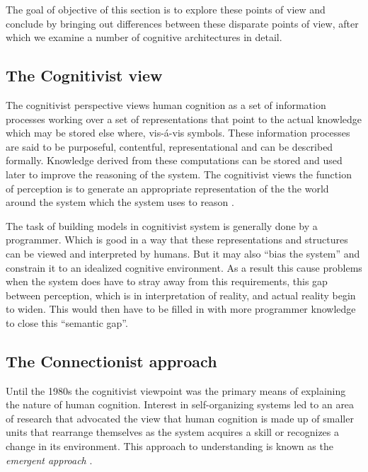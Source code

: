    The goal of objective of this section is to explore these points
    of view and conclude by bringing out differences between these
    disparate points of view, after which we examine a number of
    cognitive architectures in detail.
\subsection{The Cognitivist view}
     
     The cognitivist perspective views human cognition as a set of
     information processes working over a set of representations that
     point to the actual knowledge which may be stored else where,
     vis-\'{a}-vis symbols. These information processes are said to be
     purposeful, contentful, representational and can be described
     formally\cite{103009}. Knowledge derived from these computations
     can be stored and used later to improve the reasoning of the
     system. The cognitivist views the function of perception is to
     generate an appropriate representation of the the world around
     the system which the system uses to reason
     \cite{DBLP:journals/tec/VernonMS07}.

     The task of building models in cognitivist system is generally
     done by a programmer. Which is good in a way that these
     representations and structures can be viewed and interpreted by
     humans. But it may also ``bias the system'' and constrain it to an
     idealized cognitive environment. As a result this cause
     problems when the system does have to stray away from this
     requirements, this gap between perception, which is in
     interpretation of reality, and actual reality begin to
     widen. This would then have to be filled in with more programmer
     knowledge to close this ``semantic
     gap''\cite{DBLP:journals/tec/VernonMS07}. 
     
\subsection{The Connectionist approach}


     Until the 1980s the cognitivist viewpoint was the primary means
     of explaining the nature of human cognition. Interest in
     self-organizing systems led to an area of research that advocated
     the view that human cognition is made up of smaller units that
     rearrange themselves as the system acquires a skill or recognizes
     a change in its environment. This approach to understanding is
     known as the \emph{emergent approach}
     \cite{DBLP:journals/tec/VernonMS07}.
     
